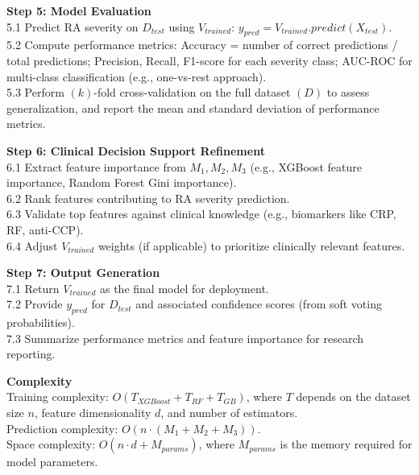 \documentclass[10pt]{NSP1}
\begin{document}
	\noindent\textbf{Step 5: Model Evaluation}\\
	5.1 Predict RA severity on $D_{test}$ using $V_{trained}$: $y_{pred} = V_{trained}.predict(X_{test})$.\\
	5.2 Compute performance metrics: Accuracy = number of correct predictions / total predictions; Precision, Recall, F1-score for each severity class; AUC-ROC for multi-class classification (e.g., one-vs-rest approach).\\
	5.3 Perform $(k)$-fold cross-validation on the full dataset $(D)$ to assess generalization, and report the mean and standard deviation of performance metrics.
	
	\noindent\textbf{Step 6: Clinical Decision Support Refinement}\\
	6.1 Extract feature importance from $M_1, M_2, M_3$ (e.g., XGBoost feature importance, Random Forest Gini importance).\\
	6.2 Rank features contributing to RA severity prediction.\\
	6.3 Validate top features against clinical knowledge (e.g., biomarkers like CRP, RF, anti-CCP).\\
	6.4 Adjust $V_{trained}$ weights (if applicable) to prioritize clinically relevant features.
	
	\noindent\textbf{Step 7: Output Generation}\\
	7.1 Return $V_{trained}$ as the final model for deployment.\\
	7.2 Provide $y_{pred}$ for $D_{test}$ and associated confidence scores (from soft voting probabilities).\\
	7.3 Summarize performance metrics and feature importance for research reporting.
	
	\noindent\textbf{Complexity}\\
	Training complexity: $O(T_{XGBoost} + T_{RF} + T_{GB})$, where $T$ depends on the dataset size $n$, feature dimensionality $d$, and number of estimators.\\
	Prediction complexity: $O(n \cdot (M_1 + M_2 + M_3))$.\\
	Space complexity: $O(n \cdot d + M_{params})$, where $M_{params}$ is the memory required for model parameters.
	
\end{document}

